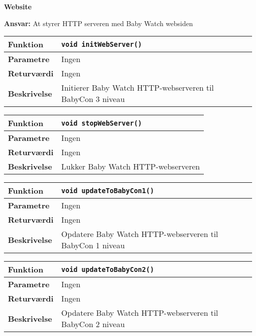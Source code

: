 {\centering
\textbf{Website}\par
}
\textbf{Ansvar:} At styrer HTTP serveren med Baby Watch websiden \

\begin{center}
    \begin{tabular}{ | l | p{} |}
    \hline
    \textbf{Funktion}	& \verb+void initWebServer() +						\\ \hline
    \textbf{Parametre} 	& Ingen		\\ \hline
    \textbf{Returværdi}	& Ingen 								\\ \hline
    \textbf{Beskrivelse}	& Initierer Baby Watch HTTP-webserveren til BabyCon 3 niveau\\ \hline
    \end{tabular}
\end{center}

\begin{center}
    \begin{tabular}{ | l | p{} |}
    \hline
    \textbf{Funktion}	& \verb+void stopWebServer() +						\\ \hline
    \textbf{Parametre} 	& Ingen		\\ \hline
    \textbf{Returværdi}	& Ingen 								\\ \hline
    \textbf{Beskrivelse}	& Lukker Baby Watch HTTP-webserveren \\ \hline
    \end{tabular}
\end{center}

\begin{center}
    \begin{tabular}{ | l | p{} |}
    \hline
    \textbf{Funktion}	& \verb+void updateToBabyCon1() +						\\ \hline
    \textbf{Parametre} 	& Ingen													\\ \hline
    \textbf{Returværdi}	& Ingen 												\\ \hline
    \textbf{Beskrivelse}	& Opdatere Baby Watch HTTP-webserveren til BabyCon 1 niveau\\ \hline
    \end{tabular}
\end{center}

\begin{center}
    \begin{tabular}{ | l | p{} |}
    \hline
    \textbf{Funktion}	& \verb+void updateToBabyCon2() +						\\ \hline
    \textbf{Parametre} 	& Ingen													\\ \hline
    \textbf{Returværdi}	& Ingen 												\\ \hline
    \textbf{Beskrivelse}	& Opdatere Baby Watch HTTP-webserveren til BabyCon 2 niveau\\ \hline
    \end{tabular}
\end{center}

